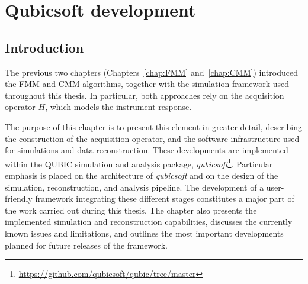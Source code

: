 \documentclass[../../thesis.tex]{subfiles}
\begin{document}
\chapter{Qubicsoft development}
\label{chap:qubicsoft}

\ifSubfilesClassLoaded{
\tableofcontents
}{
\minitoc
}

\section*{Introduction}

The previous two chapters (Chapters~\ref{chap:FMM} and~\ref{chap:CMM}) introduced the FMM and CMM algorithms, together with the simulation framework used throughout this thesis. In particular, both approaches rely on the acquisition operator $H$, which models the instrument response.

The purpose of this chapter is to present this element in greater detail, describing the construction of the acquisition operator, and the software infrastructure used for simulations and data reconstruction. These developments are implemented within the QUBIC simulation and analysis package, \emph{qubicsoft}\footnote{\url{https://github.com/qubicsoft/qubic/tree/master}}.
Particular emphasis is placed on the architecture of \emph{qubicsoft} and on the design of the simulation, reconstruction, and analysis pipeline. The development of a user-friendly framework integrating these different stages constitutes a major part of the work carried out during this thesis. 
The chapter also presents the implemented simulation and reconstruction capabilities, discusses the currently known issues and limitations, and outlines the most important developments planned for future releases of the framework. \\

\end{document}
